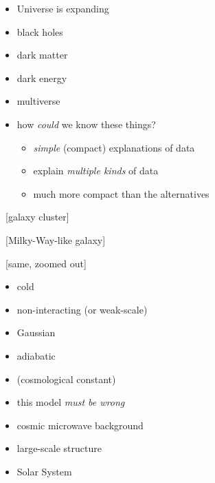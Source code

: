 \documentclass{beamer}
\begin{document}
\begin{frame}
\begin{itemize}
\item Universe is expanding
\item black holes
\item dark matter
\item dark energy
\item multiverse
\item how \emph{could} we know these things?
  \begin{itemize}
  \item \emph{simple} (compact) explanations of data
  \item explain \emph{multiple kinds} of data
  \item much more compact than the alternatives
  \end{itemize}
\end{itemize}
\end{frame}

\begin{frame}
~[galaxy cluster]
\end{frame}

\begin{frame}
~[Milky-Way-like galaxy]
\end{frame}

\begin{frame}
~[same, zoomed out]
\end{frame}

\begin{frame}
\begin{itemize}
\item cold
\item non-interacting (or weak-scale)
\item Gaussian
\item adiabatic
\item (cosmological constant)
\item this model \emph{must be wrong}
\end{itemize}
\end{frame}

\begin{frame}
\begin{itemize}
\item cosmic microwave background
\item large-scale structure
\item Solar System
\end{itemize}
\end{frame}
\end{document}
